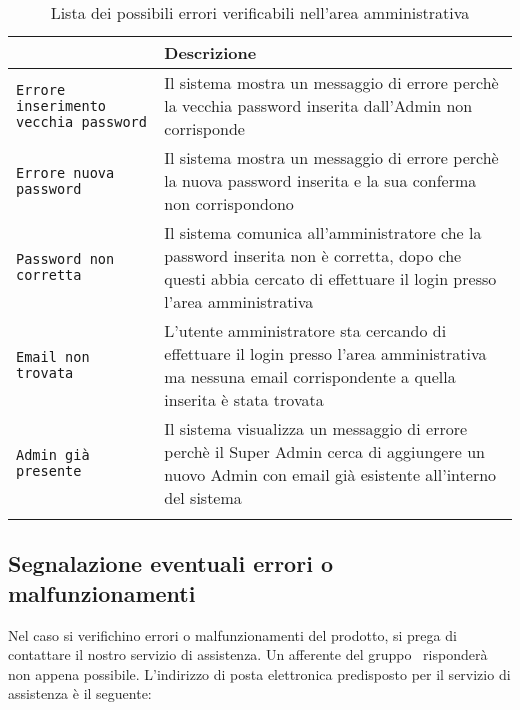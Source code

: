 \documentclass[../ManualeUtente_v2.0.0.tex]{subfiles}
\begin{document}

		 	\begin{longtable}[c] { >{\centering\arraybackslash}p{5cm} p{10cm} }
				\toprule
				{\textbf{Errore}} & {\textbf{Descrizione}} \\
				\midrule
				\texttt{Errore inserimento vecchia password} & Il sistema mostra un messaggio di errore perchè la vecchia password inserita dall’Admin non corrisponde \\
		 		\addlinespace[0.3em]
		 		\midrule
				\texttt{Errore nuova password} & Il sistema mostra un messaggio di errore perchè la nuova password inserita e la sua conferma non corrispondono \\
				\addlinespace[0.3em]
		 		\midrule
				\texttt{Password non corretta} & Il sistema comunica all’amministratore che la password inserita non è corretta, dopo che questi abbia cercato di effettuare il login presso l’area amministrativa \\
				\addlinespace[0.3em]
		 		\midrule
				\texttt{Email non trovata} & L’utente amministratore sta cercando di effettuare il login presso l’area amministrativa ma nessuna email corrispondente a quella inserita è stata trovata \\
				\addlinespace[0.3em]
		 		\midrule
				\texttt{Admin già presente} & Il sistema visualizza un messaggio di errore perchè il Super Admin cerca di aggiungere un nuovo Admin con email già esistente all'interno del sistema \\
		 		\addlinespace[0.3em]
				\bottomrule
				\caption{Lista dei possibili errori verificabili nell'area amministrativa}
			\end{longtable}

		\subsection{Segnalazione eventuali errori o malfunzionamenti}
			Nel caso si verifichino errori o malfunzionamenti del prodotto, si prega di contattare il nostro servizio di assistenza. Un afferente del gruppo \kpanic\ risponderà non appena possibile.
			\newline
			L'indirizzo di posta elettronica predisposto per il servizio di assistenza è il seguente:
			\begin{center}
			\end{center}
\end{document}
